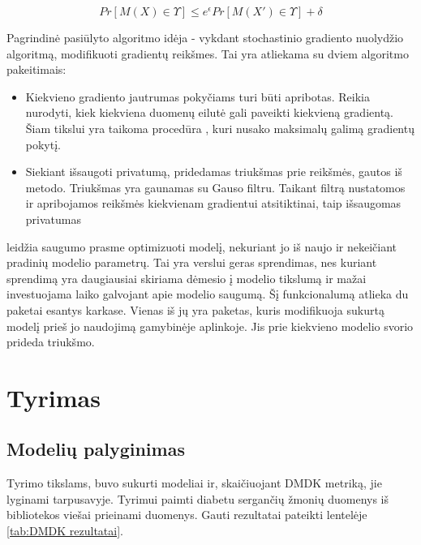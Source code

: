 \documentclass{VUMIFInfBakalaurinis}
\begin{document}
\begin{equation}
    Pr[M(X) \in \Upsilon] \leq e^{\epsilon} Pr[M(X') \in \Upsilon] + \delta
    \label{eq:Diferencinio privaluto sąlyga}
\end{equation}

\par Pagrindinė pasiūlyto algoritmo idėja - vykdant stochastinio gradiento nuolydžio algoritmą, modifikuoti gradientų reikšmes. Tai yra atliekama su dviem algoritmo pakeitimais:

\begin{itemize}
    \item Kiekvieno gradiento jautrumas pokyčiams turi būti apribotas. Reikia nurodyti, kiek kiekviena duomenų eilutė gali paveikti kiekvieną gradientą. Šiam tikslui yra taikoma procedūra , kuri nusako maksimalų galimą gradientų pokytį.
    \item Siekiant išsaugoti privatumą, pridedamas triukšmas prie reikšmės, gautos iš  metodo. Triukšmas yra gaunamas su Gauso filtru. Taikant filtrą nustatomos ir apribojamos reikšmės kiekvienam gradientui atsitiktinai, taip išsaugomas privatumas
\end{itemize}

\par {} leidžia saugumo prasme optimizuoti modelį, nekuriant jo iš naujo ir nekeičiant pradinių modelio parametrų. Tai yra verslui geras sprendimas, nes kuriant sprendimą yra daugiausiai skiriama dėmesio į modelio tikslumą ir mažai investuojama laiko galvojant apie modelio saugumą. Šį funkcionalumą atlieka du paketai esantys  karkase. Vienas iš jų yra  paketas, kuris modifikuoja sukurtą modelį prieš jo naudojimą gamybinėje aplinkoje. Jis prie kiekvieno modelio svorio prideda triukšmo.

\section{Tyrimas}
\subsection{Modelių palyginimas}

\par Tyrimo tikslams, buvo sukurti modeliai ir, skaičiuojant DMDK metriką, jie lyginami tarpusavyje. Tyrimui paimti diabetu sergančių žmonių duomenys iš  bibliotekos viešai prieinami duomenys. Gauti rezultatai pateikti lentelėje \ref{tab:DMDK rezultatai}.
\end{document}
